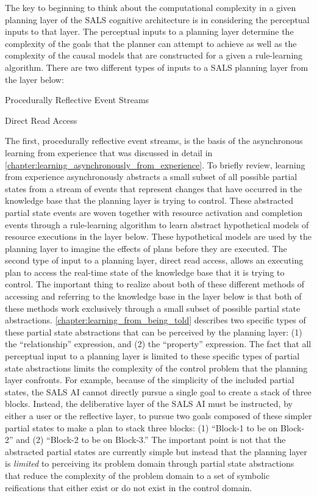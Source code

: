 The key to beginning to think about the computational complexity in a
given planning layer of the SALS cognitive architecture is in
considering the perceptual inputs to that layer.  The perceptual
inputs to a planning layer determine the complexity of the goals that
the planner can attempt to achieve as well as the complexity of the
causal models that are constructed for a given a rule-learning
algorithm.  There are two different types of inputs to a SALS planning
layer from the layer below:
\begin{packed_enumerate}
\item{Procedurally Reflective Event Streams}
\item{Direct Read Access}
\end{packed_enumerate}
The first, procedurally reflective event streams, is the basis of the
asynchronous learning from experience that was discussed in detail in
{\mbox{\autoref{chapter:learning_asynchronously_from_experience}}}.
To briefly review, learning from experience asynchronously abstracts a
small subset of all possible partial states from a stream of events
that represent changes that have occurred in the knowledge base that
the planning layer is trying to control.  These abstracted partial
state events are woven together with resource activation and
completion events through a rule-learning algorithm to learn abstract
hypothetical models of resource executions in the layer below.  These
hypothetical models are used by the planning layer to imagine the
effects of plans before they are executed.  The second type of input
to a planning layer, direct read access, allows an executing plan to
access the real-time state of the knowledge base that it is trying to
control.  The important thing to realize about both of these different
methods of accessing and referring to the knowledge base in the layer
below is that both of these methods work exclusively through a small
subset of possible partial state abstractions.
{\mbox{\autoref{chapter:learning_from_being_told}}}
describes two specific types of these partial state abstractions that
can be perceived by the planning layer: (1) the ``relationship''
expression, and (2) the ``property'' expression.  The fact that all
perceptual input to a planning layer is limited to these specific
types of partial state abstractions limits the complexity of the
control problem that the planning layer confronts.  For example,
because of the simplicity of the included partial states, the SALS AI
cannot directly pursue a single goal to create a stack of three
blocks.  Instead, the deliberative layer of the SALS AI must be
instructed, by either a user or the reflective layer, to pursue two
goals composed of these simpler partial states to make a plan to stack
three blocks: (1) ``Block-1 to be on Block-2'' and (2) ``Block-2 to be
on Block-3.''  The important point is not that the abstracted partial
states are currently simple but instead that the planning layer is
\emph{limited} to perceiving its problem domain through partial state
abstractions that reduce the complexity of the problem domain to a set
of symbolic reifications that either exist or do not exist in the
control domain.

